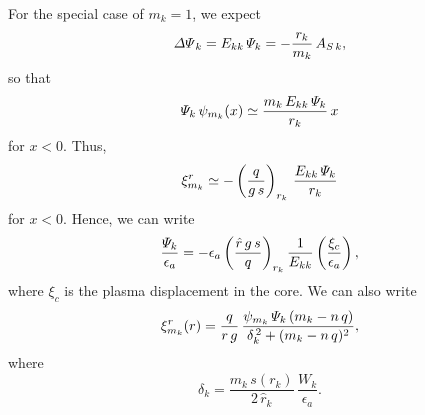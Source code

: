 \documentclass[12pt,prb,aps,notitlepage]{revtex4-1}
\begin{document}
For the special case of $m_k=1$, we expect
\begin{equation}
{\mit\Delta\Psi}_k = E_{kk}\,{\mit\Psi}_k =- \frac{r_k}{m_k}\,A_{S\,k},
\end{equation}
so that 
\begin{equation}
{\mit\Psi}_k\,\psi_{m_k}(x) \simeq \frac{m_k\,E_{kk}\,{\mit\Psi}_k}{r_k}\,x
\end{equation}
for $x<0$. Thus,
\begin{equation}
\xi^r_{m_k}\simeq - \left(\frac{q}{g\,s}\right)_{r_k}\,\frac{E_{kk}\,{\mit\Psi}_k}{r_k}
\end{equation}
for $x<0$. Hence, we can write
\begin{equation}
\frac{{\mit\Psi}_k}{\epsilon_a}= -\epsilon_a\left(\frac{\hat{r}\,g\,s}{q}\right)_{r_k}\frac{1}{E_{kk}} \left(\frac{\xi_c}{\epsilon_a}\right),
\end{equation}
where $\xi_c$ is the plasma displacement in the core. We can also write
\begin{equation}
\xi^r_{m_k}(r) = \frac{q}{r\,g}\,\frac{\psi_{m_k}\,{\mit\Psi}_k\,(m_k-n\,q)}{\delta_k^{\,2}  +(m_k-n\,q)^2},
\end{equation}
where 
\begin{equation}
\delta_k = \frac{m_k\,s(r_k)}{2\,\hat{r}_k}\,\frac{W_k}{\epsilon_a}.
\end{equation}
\end{document}
